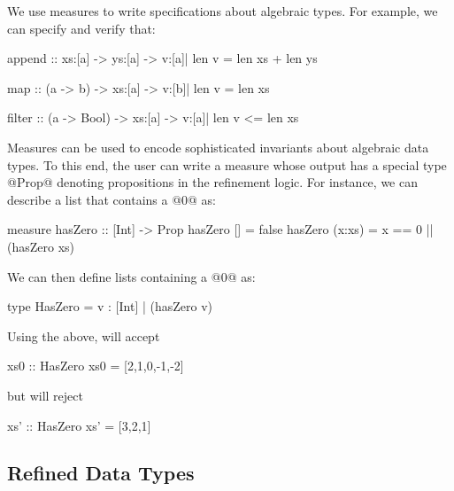 We use measures to write specifications about algebraic types. 
For example, we can specify and verify that: 
%
\begin{code}
  append :: xs:[a] -> ys:[a] 
         -> {v:[a]| len v = len xs + len ys}

  map    :: (a -> b) -> xs:[a] 
         -> {v:[b]| len v = len xs} 

  filter :: (a -> Bool) -> xs:[a] 
         -> {v:[a]| len v <= len xs}
\end{code}

Measures can be used to encode sophisticated 
invariants about algebraic data types.
%
To this end, the user can write a measure whose output has a special type 
@Prop@ denoting propositions in the refinement logic. For instance, we can
describe a list that contains a @0@ as:
%
\begin{code}
  measure hasZero :: [Int] -> Prop
  hasZero []      = false
  hasZero (x:xs)  = x == 0 || (hasZero xs) 
\end{code}
%
We can then define lists containing a @0@ as:
%
\begin{code}
  type HasZero = {v : [Int] | (hasZero v)} 
\end{code}
%
Using the above, \toolname will accept 
%
\begin{code}
  xs0 :: HasZero 
  xs0 = [2,1,0,-1,-2]
\end{code}
%
but will reject
%
\begin{code}
  xs' :: HasZero 
  xs' = [3,2,1]
\end{code}



\subsection{Refined Data Types}

